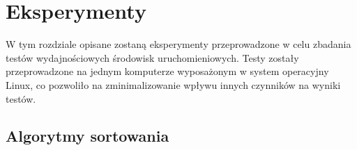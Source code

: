 \section{Eksperymenty}
W tym rozdziale opisane zostaną eksperymenty przeprowadzone w celu zbadania testów wydajnościowych środowisk uruchomieniowych. Testy zostały przeprowadzone na jednym komputerze wyposażonym w system operacyjny Linux, co pozwoliło na zminimalizowanie wpływu innych czynników na wyniki testów. 

\subsection{Algorytmy sortowania}

